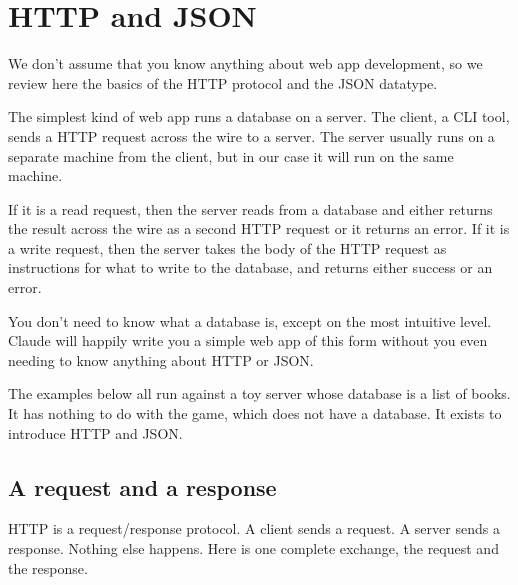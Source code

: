 \documentclass[11pt,a4paper]{article}
\begin{document}
\newpage

\section{HTTP and JSON}
\label{sec:http}

We don't assume that you know anything about web app development, so we review here the basics of
the HTTP protocol and the JSON datatype.

The simplest kind of web app runs a database on a server. The client, a CLI tool, sends a HTTP
request across the wire to a server. The server usually runs on a separate machine from the
client, but in our case it will run on the same machine.

If it is a read request, then the server reads from a database and either returns the result
across the wire as a second HTTP request or it returns an error. If it is a write request,
then the server takes the body of the HTTP request as instructions for what to write to the
database, and returns either success or an error.

You don't need to know what a database is, except on the most intuitive level. Claude will happily
write you a simple web app of this form without you even needing to know anything about HTTP or
JSON.

The examples below all run against a toy server whose database is a list of books. It has nothing
to do with the game, which does not have a database. It exists to introduce HTTP and JSON.

\subsection{A request and a response}

HTTP is a request/response protocol. A client sends a request. A server sends a response. Nothing
else happens. Here is one complete exchange, the request and the response.
\end{document}
